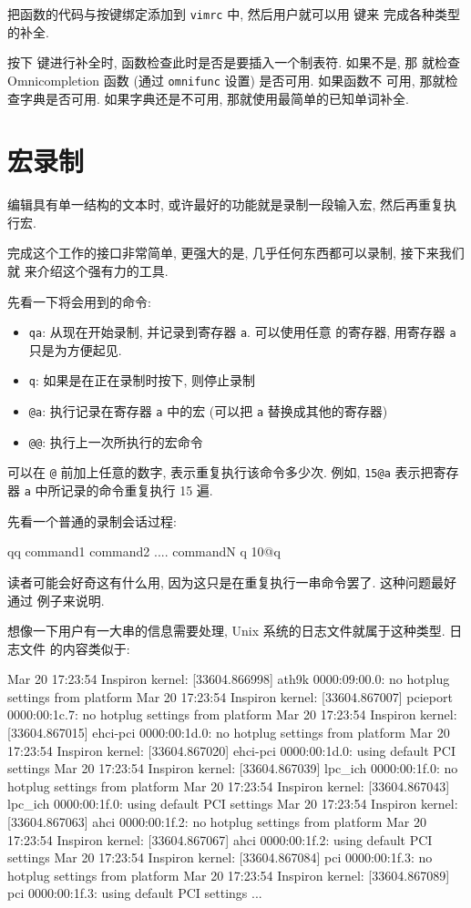 把函数的代码与按键绑定添加到 \texttt{vimrc} 中, 然后用户就可以用  键来
完成各种类型的补全.

按下  键进行补全时, 函数检查此时是否是要插入一个制表符. 如果不是, 那
就检查 Omnicompletion 函数 (通过 \texttt{omnifunc} 设置) 是否可用. 如果函数不
可用, 那就检查字典是否可用. 如果字典还是不可用, 那就使用最简单的已知单词补全.

\section{宏录制}
\label{sec:using_macro_recording}

编辑具有单一结构的文本时, 或许最好的功能就是录制一段输入宏, 然后再重复执行宏.

完成这个工作的接口非常简单, 更强大的是, 几乎任何东西都可以录制, 接下来我们就
来介绍这个强有力的工具.

先看一下将会用到的命令:
\begin{itemize}
    \item \texttt{qa}: 从现在开始录制, 并记录到寄存器 \texttt{a}. 可以使用任意
        的寄存器, 用寄存器 \texttt{a} 只是为方便起见.
    \item \texttt{q}: 如果是在正在录制时按下, 则停止录制
    \item \texttt{@a}: 执行记录在寄存器 \texttt{a} 中的宏 (可以把 \texttt{a}
        替换成其他的寄存器)
    \item \texttt{@@}: 执行上一次所执行的宏命令
\end{itemize}
可以在 \texttt{@} 前加上任意的数字, 表示重复执行该命令多少次. 例如,
\texttt{15@a} 表示把寄存器 \texttt{a} 中所记录的命令重复执行 15 遍.

先看一个普通的录制会话过程:
\begin{vimcode}
qq
command1
command2
....
commandN
q
10@q
\end{vimcode}
读者可能会好奇这有什么用, 因为这只是在重复执行一串命令罢了. 这种问题最好通过
例子来说明.

想像一下用户有一大串的信息需要处理, Unix 系统的日志文件就属于这种类型. 日志文件
的内容类似于:
\begin{vimcode}
Mar 20 17:23:54 Inspiron kernel: [33604.866998] ath9k 0000:09:00.0: no hotplug settings from platform
Mar 20 17:23:54 Inspiron kernel: [33604.867007] pcieport 0000:00:1c.7: no hotplug settings from platform
Mar 20 17:23:54 Inspiron kernel: [33604.867015] ehci-pci 0000:00:1d.0: no hotplug settings from platform
Mar 20 17:23:54 Inspiron kernel: [33604.867020] ehci-pci 0000:00:1d.0: using default PCI settings
Mar 20 17:23:54 Inspiron kernel: [33604.867039] lpc_ich 0000:00:1f.0: no hotplug settings from platform
Mar 20 17:23:54 Inspiron kernel: [33604.867043] lpc_ich 0000:00:1f.0: using default PCI settings
Mar 20 17:23:54 Inspiron kernel: [33604.867063] ahci 0000:00:1f.2: no hotplug settings from platform
Mar 20 17:23:54 Inspiron kernel: [33604.867067] ahci 0000:00:1f.2: using default PCI settings
Mar 20 17:23:54 Inspiron kernel: [33604.867084] pci 0000:00:1f.3: no hotplug settings from platform
Mar 20 17:23:54 Inspiron kernel: [33604.867089] pci 0000:00:1f.3: using default PCI settings
...
\end{vimcode}

